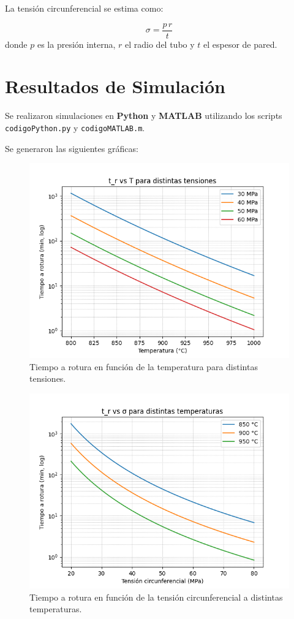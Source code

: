\documentclass[12pt,a4paper]{article}
\begin{document}
La tensión circunferencial se estima como:

\begin{equation}
    \sigma = \frac{p \, r}{t}
\end{equation}
donde $p$ es la presión interna, $r$ el radio del tubo y $t$ el espesor de pared.

\section{Resultados de Simulación}
Se realizaron simulaciones en \textbf{Python} y \textbf{MATLAB} utilizando los scripts \texttt{codigoPython.py} y \texttt{codigoMATLAB.m}.

Se generaron las siguientes gráficas:

\begin{figure}[H]
    \centering
    \includegraphics[width=0.7\linewidth]{Figuras/tr_vs_T.png}
    \caption{Tiempo a rotura en función de la temperatura para distintas tensiones.}
\end{figure}

\begin{figure}[H]
    \centering
    \includegraphics[width=0.7\linewidth]{Figuras/tr_vs_sigma.png}
    \caption{Tiempo a rotura en función de la tensión circunferencial a distintas temperaturas.}
\end{figure}
\end{document}
